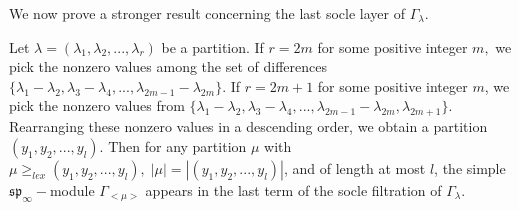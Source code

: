 \documentclass[main.tex]{subfiles}
\begin{document}
\bigskip


We now prove a stronger result concerning the last socle layer of $\Gamma_\lambda.$\\
\bigskip

\begin{prop}
\label{prop-soc-last-term-general}
     Let $\lambda = (\lambda_1, \lambda_2, ..., \lambda_{r})$ be a partition. If $r=2m$ for some positive integer $m,$ we pick the nonzero values among the set of differences $\{\lambda_1-\lambda_2, \lambda_3-\lambda_4, ..., \lambda_{2m-1}-\lambda_{2m}\}.$ If $r=2m+1$ for some positive integer $m$, we pick the nonzero values from $\{\lambda_1-\lambda_2, \lambda_3-\lambda_4, ..., \lambda_{2m-1}-\lambda_{2m}, \lambda_{2m+1}\}.$ Rearranging these nonzero values in a descending order, we obtain a partition $(y_1, y_2, ..., y_l)$. 
     Then for any partition $\mu$ with $\mu\geq_{lex}(y_1, y_2, ..., y_l), \; |\mu|=|(y_1, y_2, ..., y_l)|$, and of length at most $l$, the simple $\mathfrak{sp}_\infty-$module $\Gamma_{<\mu>}$ appears in the last term of the socle filtration of  $\Gamma_\lambda$. 
\end{prop}
\end{document}
